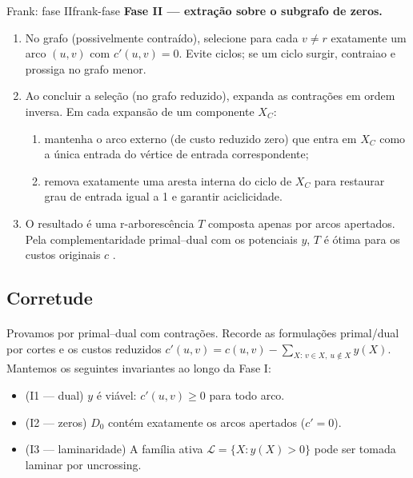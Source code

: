 \documentclass[12pt,a4paper]{article}
\def\emph#1{#1}%
\begin{document}
\begin{algobox}{Frank: fase II}{frank-fase}
\textbf{Fase II — extração sobre o subgrafo de zeros.}
    \begin{enumerate}\setlength{\itemsep}{1pt}
        \item No grafo (possivelmente contraído), selecione para cada \(v\neq r\) exatamente um arco \((u,v)\) com \(c'(u,v)=0\). Evite ciclos; se um ciclo surgir, contraia\-o e prossiga no grafo menor.
        \item Ao concluir a seleção (no grafo reduzido), expanda as contrações em ordem inversa. Em cada expansão de um componente \(X_C\):
        \begin{enumerate}\setlength{\itemsep}{1pt}
            \item mantenha o arco externo (de custo reduzido zero) que \emph{entra} em \(X_C\) como a única entrada do vértice de entrada correspondente;
            \item remova exatamente uma aresta interna do ciclo de \(X_C\) para restaurar grau de entrada igual a 1 e garantir aciclicidade.
        \end{enumerate}
    \item O resultado é uma r-arborescência \(T\) composta apenas por arcos \emph{apertados}. Pela complementaridade primal–dual com os potenciais \(y\), \(T\) é ótima para os custos originais \(c\) \cite{frank2014,schrijver2003comb}.
    \end{enumerate}
\end{algobox}

\subsection{Corretude}
\paragraph{}
Provamos por primal–dual com contrações. Recorde as formulações primal/dual por cortes e os \emph{custos reduzidos} \(c'(u,v)=c(u,v)-\sum_{X:\,v\in X,\ u\notin X} y(X)\). Mantemos os seguintes invariantes ao longo da Fase I:
\begin{itemize}\setlength{\itemsep}{2pt}
    \item (I1 — dual) \(y\) é viável: \(c'(u,v)\ge 0\) para todo arco.
    \item (I2 — zeros) \(D_0\) contém exatamente os arcos \emph{apertados} (\(c'=0\)).
    \item (I3 — laminaridade) A família ativa \(\mathcal{L}=\{X: y(X)>0\}\) pode ser tomada laminar por \emph{uncrossing}.
\end{itemize}
\end{document}
